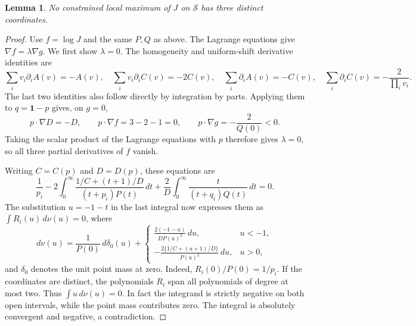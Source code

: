 \documentclass[11pt]{article}
\newtheorem{lemma}{Lemma}
\begin{document}
\begin{lemma}\label{upper-extrema}
No constrained local maximum of $J$ on $\mathcal S$ has three distinct
coordinates.
\end{lemma}
\begin{proof}
Use $f=\log J$ and the same $P,Q$ as above. The Lagrange equations give
$\nabla f=\lambda\nabla g$. We first show $\lambda=0$.
The homogeneity and uniform-shift derivative identities are
\[
 \sum_i v_i\partial_i A(v)=-A(v),\quad
 \sum_i v_i\partial_i C(v)=-2C(v),\quad
 \sum_i\partial_i A(v)=-C(v),\quad
 \sum_i\partial_i C(v)=-\frac2{\prod_i v_i}.
\]
The last two identities also follow directly by integration by parts.
Applying them to $q=\boldsymbol1-p$ gives, on $g=0$,
\[
 p\cdot\nabla D=-D,\qquad
 p\cdot\nabla f=3-2-1=0,\qquad
 p\cdot\nabla g=-\frac2{Q(0)}<0.
\]
Taking the scalar product of the Lagrange equations with $p$ therefore gives
$\lambda=0$, so all three partial derivatives of $f$ vanish.

Writing $C=C(p)$ and $D=D(p)$, these equations are
\[
 \frac1{p_i}
 -2\int_0^\infty
 \frac{1/C+(t+1)/D}{(t+p_i)P(t)}\,dt
 +\frac2D\int_0^\infty\frac{t}{(t+q_i)Q(t)}\,dt=0.
\]
The substitution $u=-1-t$ in the last integral now expresses them as
$\int R_i(u)\,d\nu(u)=0$, where
\[
 d\nu(u)=\frac1{P(0)}\,d\delta_0(u)
 +\begin{cases}
 \displaystyle\frac{2(-1-u)}{D P(u)^2}\,du,&u<-1,\\[4pt]
 \displaystyle-\frac{2\{1/C+(u+1)/D\}}{P(u)^2}\,du,&u>0,
 \end{cases}
\]
and $\delta_0$ denotes the unit point mass at zero. Indeed,
$R_i(0)/P(0)=1/p_i$. If the coordinates are distinct, the polynomials
$R_i$ span all polynomials of degree at most two. Thus $\int u\,d\nu(u)=0$.
In fact the integrand is strictly negative on both open intervals, while
the point mass contributes zero. The integral is absolutely convergent
and negative, a contradiction.
\end{proof}
\end{document}
